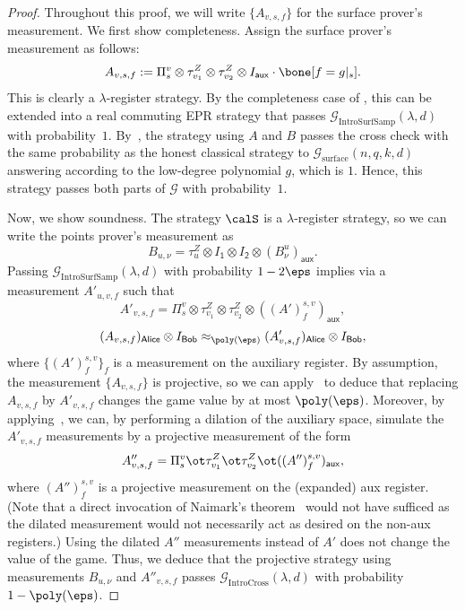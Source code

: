 \documentclass[11pt]{article}
\newcommand{\game}{\mathscr{G}}
\newcommand{\reg}[1]{{\mathsf{#1}}}
\begin{document}
\begin{proof}
Throughout this proof, we will write $\{A_{v, s, f}\}$ for the surface prover's measurement.
We first show completeness.
Assign the surface prover's measurement as follows:
\begin{equation*}
A_{v,s, f}  := \Pi^{v}_s \otimes \tau^Z_{v_1} \otimes \tau^Z_{v_2} \otimes I_{\reg{aux}} \cdot \bone[f = g|_{s}].
\end{equation*}
This is clearly a $\lambda$-register strategy. By the completeness
case of , this can be extended into a real
commuting EPR strategy that passes $\game_{\mathrm{IntroSurfSamp}}(\lambda, d)$ with
probability~$1$. By~, the strategy using $A$
and $B$ passes the cross check with the same probability as the
honest classical strategy to $\game_{\mathrm{surface}}(n, q, k, d)$ answering according
to the low-degree polynomial $g$, which is $1$. Hence, this strategy
passes both parts of $\game$ with probability~$1$.

Now, we show soundness.
The strategy $\calS$ is a $\lambda$-register strategy, so we can write the points prover's measurement as
\begin{equation*}
B_{u, \nu} = \tau^Z_u \otimes I_{\reg{1}} \otimes I_{\reg{2}} \otimes (B^u_{\nu})_{\reg{aux}}.
\end{equation*}
Passing $\game_{\mathrm{IntroSurfSamp}}(\lambda, d)$ with probability $1-2\eps$
implies via  a measurement $A'_{u, v, f}$ such that
\begin{equation*}
A'_{ v,s, f} = \Pi^{v}_s \otimes \tau^Z_{v_1} \otimes \tau^Z_{v_2} \otimes ((A')^{s, v}_f)_{\reg{aux}},
\end{equation*}
\begin{equation*}
(A_{v, s, f})_{\reg{Alice}} \otimes I_{\reg{Bob}}
\approx_{\poly(\eps)}  (A'_{v, s, f})_{\reg{Alice}} \otimes I_{\reg{Bob}},
\end{equation*}
where $\{(A')^{s,v}_f\}_{f}$ is a measurement on the auxiliary
register. By assumption, the measurement $\{A_{v,s,f}\}$ is
projective, so
we can apply~ to deduce
that replacing $A_{v,s,f}$ by $A'_{v,s,f}$ changes the game value by
at most $\poly(\eps)$. Moreover, by applying~, we can, by
performing a dilation of the auxiliary space, simulate the
$A'_{v,s,f}$ measurements by a projective measurement of the form
\[ A''_{v,s,f} = \Pi^v_s \ot \tau^Z_{v_1} \ot \tau^Z_{v_2} \ot
  ((A'')^{s,v}_f)_{\reg{aux}}, \]
where $(A'')^{s,v}_f$ is a projective measurement on the (expanded)
aux register. (Note that a direct invocation of Naimark's
theorem~ would not have sufficed as the dilated
measurement would not necessarily act as desired on the non-aux
registers.) Using the dilated $A''$ measurements instead of $A'$ does
not change the value of the game. Thus, we deduce that the projective strategy
using measurements $B_{u,\nu}$ and $A''_{v,s,f}$ passes
$\game_{\mathrm{IntroCross}}(\lambda, d)$ with probability
$1-\poly(\eps)$.


\end{proof}
\end{document}
